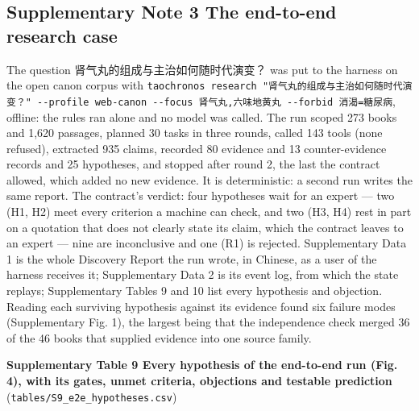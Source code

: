\documentclass[
]{article}
\begin{document}
\hypertarget{supplementary-note-3-the-end-to-end-research-case}{%
\subsection{Supplementary Note 3 \textbar{} The end-to-end research
case}\label{supplementary-note-3-the-end-to-end-research-case}}

The question 肾气丸的组成与主治如何随时代演变？ was put to the harness
on the open canon corpus with
\texttt{taochronos\ research\ "肾气丸的组成与主治如何随时代演变？"\ -\/-profile\ web-canon\ -\/-focus\ 肾气丸,六味地黄丸\ -\/-forbid\ 消渴=糖尿病},
offline: the rules ran alone and no model was called. The run scoped 273
books and 1,620 passages, planned 30 tasks in three rounds, called 143
tools (none refused), extracted 935 claims, recorded 80 evidence and 13
counter-evidence records and 25 hypotheses, and stopped after round 2,
the last the contract allowed, which added no new evidence. It is
deterministic: a second run writes the same report. The contract's
verdict: four hypotheses wait for an expert --- two (H1, H2) meet every
criterion a machine can check, and two (H3, H4) rest in part on a
quotation that does not clearly state its claim, which the contract
leaves to an expert --- nine are inconclusive and one (R1) is rejected.
Supplementary Data 1 is the whole Discovery Report the run wrote, in
Chinese, as a user of the harness receives it; Supplementary Data 2 is
its event log, from which the state replays; Supplementary Tables 9 and
10 list every hypothesis and objection. Reading each surviving
hypothesis against its evidence found six failure modes (Supplementary
Fig. 1), the largest being that the independence check merged 36 of the
46 books that supplied evidence into one source family.

\textbf{Supplementary Table 9 \textbar{} Every hypothesis of the
end-to-end run (Fig. 4), with its gates, unmet criteria, objections and
testable prediction} (\texttt{tables/S9\_e2e\_hypotheses.csv})
\end{document}
